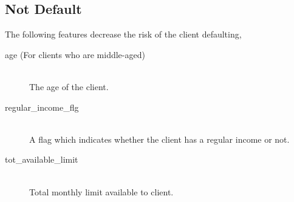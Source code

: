  \subsection{Not Default}
 The following features decrease the risk of the client defaulting,
 \begin{description}
     \item[age (For clients who are middle-aged)] \hfill \\ The age of the client.
     \item[regular\_income\_flg] \hfill \\ A flag which indicates whether the client has a regular income or not.
     \item[tot\_available\_limit] \hfill \\ Total monthly limit available to client.
 \end{description}
